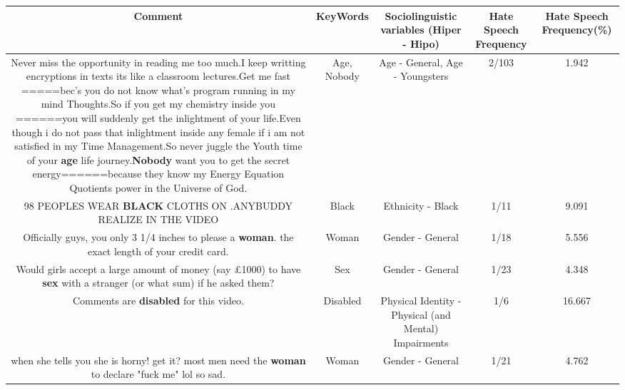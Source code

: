 \documentclass[11pt]{article}
\newlength\mylength
\begin{document}
\begin{center}
\setlength\mylength{\dimexpr\textwidth - 1\arrayrulewidth - 50\tabcolsep}
\begin{longtable}{|C{.65\mylength}|C{.30\mylength}|C{.12\mylength}|C{.12\mylength}|C{.12\mylength}|}
\hline
\textbf{Comment} & \textbf{KeyWords} & \textbf{Sociolinguistic variables (Hiper - Hipo)}  & \textbf{Hate Speech Frequency} & \textbf{Hate Speech Frequency(\%)} \\
\hline{}\small Never miss the opportunity in reading me too much.I keep writting encryptions in texts its like a classroom lectures.Get me fast =====bec's you do not know what's program running in my mind Thoughts.So if you get my chemistry inside you ======you will suddenly get the inlightment of your life.Even though i do not pass that inlightment inside any female if i am not satisfied in my Time Management.So never juggle the Youth time of your \textbf{age} life journey.\textbf{Nobody} want you to get the secret energy======because they know my Energy Equation Quotients power in the Universe of God.\normalsize   & Age, Nobody & Age - General, Age - Youngsters & 2/103 & 1.942 \\  \hline
  \small 98 PEOPLES WEAR \textbf{BLACK} CLOTHS ON .ANYBUDDY REALIZE IN THE VIDEO\normalsize   & Black & Ethnicity - Black & 1/11 & 9.091 \\  \hline
  \small Officially guys, you only 3 1/4 inches to please a \textbf{woman}. the exact length of your credit card.\normalsize   & Woman & Gender - General & 1/18 & 5.556 \\  \hline
  \small Would girls accept a large amount of money (say £1000) to have \textbf{sex} with a stranger (or what sum) if he asked them?\normalsize   & Sex & Gender - General & 1/23 & 4.348 \\  \hline
  \small Comments are \textbf{disabled} for this video.\normalsize   & Disabled & Physical Identity - Physical (and Mental) Impairments & 1/6 & 16.667 \\  \hline
  \small when  she tells you she is horny! get it? most men need the \textbf{woman} to declare "fuck me" lol so sad.\normalsize   & Woman & Gender - General & 1/21 & 4.762 \\  \hline

\end{longtable}
\end{center}
\end{document}
